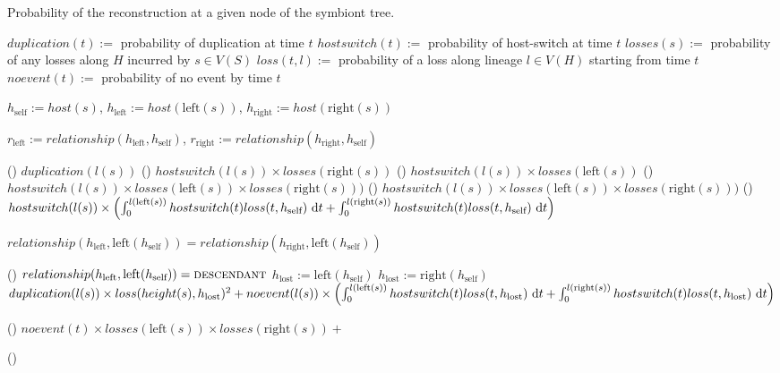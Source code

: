 \documentclass[12pt,letterpaper]{article}
\begin{document}
\begin{algorithm}
\caption{Probability of the reconstruction at a given node of the symbiont tree.}


$duplication(t) := $ probability of duplication at time $t$\;
$hostswitch(t) := $ probability of host-switch at time $t$\;
$losses(s) := $ probability of any losses along $H$ incurred by $s \in V(S)$\;
$loss(t,l) := $ probability of a loss along lineage $l \in V(H)$ starting from time $t$\;
$noevent(t) := $ probability of no event by time $t$\;

$h_\text{self} := host(s)$, $h_\text{left} := host(\text{left}(s))$, $h_\text{right} := host(\text{right}(s))$\;

$r_\text{left} := relationship(h_\text{left},h_\text{self})$, $r_\text{right} := relationship(h_\text{right},h_\text{self})$\;

\uIf
()
{}
{
\Return $duplication(l(s))$\;}
\uElseIf
()
{}
{
\Return $hostswitch(l(s)) \times losses(\text{right}(s))$\;}
\uElseIf
()
{}
{\Return $hostswitch(l(s)) \times losses(\text{left}(s))$\;}
\uElseIf
()
{}
{
\Return $hostswitch(l(s)) \times losses(\text{left}(s)) \times losses(\text{right}(s)))$\;}
\uElseIf
()
{}
{\Return $hostswitch(l(s)) \times losses(\text{left}(s)) \times losses(\text{right}(s)))$\;}
\uElseIf
()
{}
{
\Return $hostswitch(l(s)) \times \left(\int_0^{l(\text{left}(s))} hostswitch(t) loss(t,h_\text{self}) \,\dif t + \int_0^{l(\text{right}(s))} hostswitch(t) loss(t,h_\text{self}) \,\dif t \right)$\;}
\uElseIf
{}
{
\uIf
{$relationship(h_\text{left},\text{left}(h_\text{self})) = relationship(h_\text{right},\text{left}(h_\text{self}))$}
{
\uIf()
{$relationship(h_\text{left},\text{left}(h_\text{self})) = \text{\textsc{descendant}}$}
{$h_\text{lost} := \text{left}(h_\text{self})$}
\Else
{$h_\text{lost} := \text{right}(h_\text{self})$}
\Return $duplication(l(s)) \times loss(height(s),h_\text{lost})^2 + noevent(l(s)) \times \left(\int_0^{l(\text{left}(s))} hostswitch(t) loss(t,h_\text{lost}) \,\dif t + \int_0^{l(\text{right}(s))} hostswitch(t) loss(t,h_\text{lost}) \,\dif t \right)$\;

}
\Else
()
{\Return $noevent(t) \times losses(\text{left}(s)) \times losses(\text{right}(s)) + $\;
}
}
\Else
()
{\;}

\end{algorithm}
\end{document}
